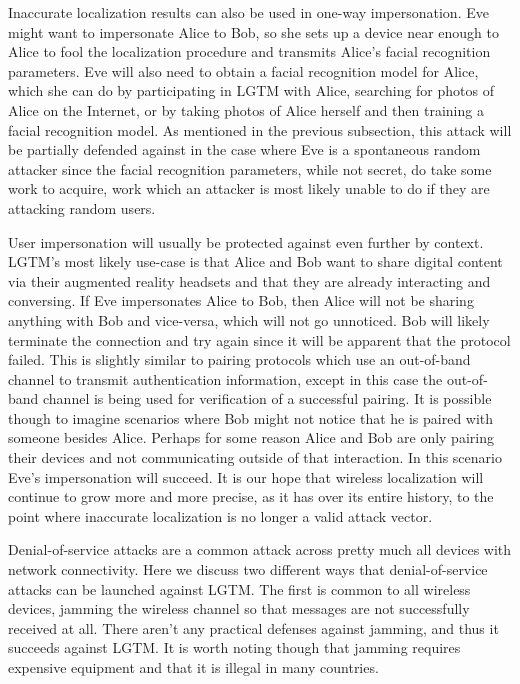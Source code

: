 \documentclass[12pt]{report}
\begin{document}
Inaccurate localization results can also be used in one-way impersonation. Eve might want to impersonate Alice to Bob, so she sets up a device near enough to Alice to fool the localization procedure and transmits Alice's facial recognition parameters. Eve will also need to obtain a facial recognition model for Alice, which she can do by participating in LGTM with Alice, searching for photos of Alice on the Internet, or by taking photos of Alice herself and then training a facial recognition model. As mentioned in the previous subsection, this attack will be partially defended against in the case where Eve is a spontaneous random attacker since the facial recognition parameters, while not secret, do take some work to acquire, work which an attacker is most likely unable to do if they are attacking random users. \par

User impersonation will usually be protected against even further by context. LGTM's most likely use-case is that Alice and Bob want to share digital content via their augmented reality headsets and that they are already interacting and conversing. If Eve impersonates Alice to Bob, then Alice will not be sharing anything with Bob and vice-versa, which will not go unnoticed. Bob will likely terminate the connection and try again since it will be apparent that the protocol failed. This is slightly similar to pairing protocols which use an out-of-band channel to transmit authentication information, except in this case the out-of-band channel is being used for verification of a successful pairing. It is possible though to imagine scenarios where Bob might not notice that he is paired with someone besides Alice. Perhaps for some reason Alice and Bob are only pairing their devices and not communicating outside of that interaction. In this scenario Eve's impersonation will succeed. It is our hope that wireless localization will continue to grow more and more precise, as it has over its entire history, to the point where inaccurate localization is no longer a valid attack vector. \par

Denial-of-service attacks are a common attack across pretty much all devices with network connectivity. Here we discuss two different ways that denial-of-service attacks can be launched against LGTM. The first is common to all wireless devices, jamming the wireless channel so that messages are not successfully received at all. There aren't any practical defenses against jamming, and thus it succeeds against LGTM. It is worth noting though that jamming requires expensive equipment and that it is illegal in many countries. \par
\end{document}
